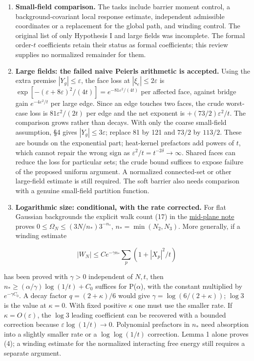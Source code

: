 \documentclass[11pt,a4paper]{article}
\begin{document}
\begin{enumerate}
\def\labelenumi{(\alph{enumi})}
\item
  \textbf{Small-field comparison.} The tasks include barrier moment
  control, a background-covariant local response estimate, independent
  admissible coordinates or a replacement for the global path, and
  winding control. The original list of only Hypothesis I and large
  fields was incomplete. The formal order-\(t\) coefficients retain
  their status as formal coefficients; this review supplies no
  normalized remainder for them.
\item
  \textbf{Large fields: the failed naive Peierls arithmetic is
  accepted.} Using the extra premise \(|Y_g|\le\varepsilon\), the face
  loss at \(|\xi_e|\le2\varepsilon\) is
  \(\exp[-(\varepsilon+8\varepsilon)^2/(4t)] =e^{-81\varepsilon^2/(4t)}\)
  per affected face, against bridge gain \(e^{-4\varepsilon^2/t}\) per
  large edge. Since an edge touches two faces, the crude worst-case loss
  is \(81\varepsilon^2/(2t)\) per edge and the net exponent is
  \(+(73/2)\varepsilon^2/t\). The comparison grows rather than decays.
  With only the coarse small-field assumption, §4 gives
  \(|Y_g|\le3\varepsilon\); replace 81 by 121 and \(73/2\) by \(113/2\).
  These are bounds on the exponential part; heat-kernel prefactors add
  powers of \(t\), which cannot repair the wrong sign as
  \(\varepsilon^2/t=t^{-2\delta}\to\infty\). Shared faces can reduce the
  loss for particular sets; the crude bound suffices to expose failure
  of the proposed uniform argument. A normalized connected-set or other
  large-field estimate is still required. The soft barrier also needs
  comparison with a genuine small-field partition function.
\item
  \textbf{Logarithmic size: conditional, with the rate corrected.} For
  flat Gaussian backgrounds the explicit walk count (17) in the
  \href{su2-midplane-order-t.md}{mid-plane note} proves
  \(0\le\Omega_N\le(3N/n_*)3^{-n_*}\), \(n_*=\min(N_2,N_3)\). More
  generally, if a winding estimate
\end{enumerate}

\[|W_N|\le C e^{-\gamma n_*}\sum_p(1+|X_p|^2/t)\tag{19}\]

has been proved with \(\gamma>0\) independent of \(N,t\), then
\(n_*\ge(\alpha/\gamma)\log(1/t)+C_0\) suffices for P(\(\alpha\)), with
the constant multiplied by \(e^{-\gamma C_0}\). A decay factor
\(q=(2+\kappa)/6\) would give \(\gamma=\log(6/(2+\kappa))\); \(\log3\)
is the value at \(\kappa=0\). With fixed positive \(\kappa\) one must
use the smaller rate. If \(\kappa=O(\varepsilon)\), the \(\log3\)
leading coefficient can be recovered with a bounded correction because
\(\varepsilon\log(1/t)\to0\). Polynomial prefactors in \(n_*\) need
absorption into a slightly smaller rate or a \(\log\log(1/t)\)
correction. Lemma 1 alone proves (4); a winding estimate for the
normalized interacting free energy still requires a separate argument.
\end{document}

